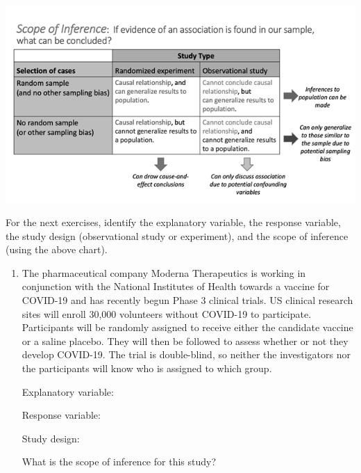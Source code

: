 \documentclass[
]{report}
\begin{document}
\begin{center}\includegraphics[width=0.75\linewidth]{images/ScopeOfInferenceGreyscale} \end{center}

For the next exercises, identify the explanatory variable, the response variable, the study design (observational study or experiment), and the scope of inference (using the above chart).

\begin{enumerate}
\def\labelenumi{\arabic{enumi}.}
\setcounter{enumi}{4}
\item
  The pharmaceutical company Moderna Therapeutics is working in conjunction with the National Institutes of Health towards a vaccine for COVID-19 and has recently begun Phase 3 clinical trials. US clinical research sites will enroll 30,000 volunteers without COVID-19 to participate. Participants will be randomly assigned to receive either the candidate vaccine or a saline placebo. They will then be followed to assess whether or not they develop COVID-19. The trial is double-blind, so neither the investigators nor the participants will know who is assigned to which group.
  \vspace{0.1in}

  Explanatory variable:
  \vspace{0.25in}

  Response variable:
  \vspace{0.25in}

  Study design:
  \vspace{0.25in}

  What is the scope of inference for this study?
  \vspace{0.5in}
\end{enumerate}

\newpage
\end{document}

